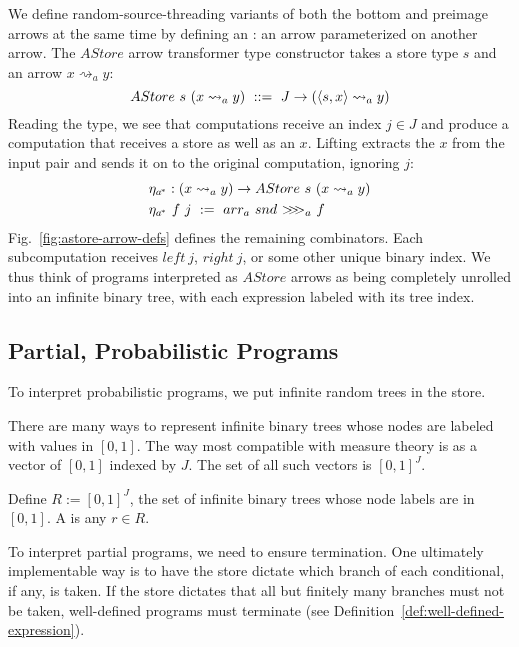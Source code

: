 \documentclass{llncs}
\newcommand{\figref}[1]{Fig.~\ref{#1}}
\newcommand{\arrow}{\rightsquigarrow}
\newcommand{\acomp}{\ensuremath{{>}\mspace{-6mu}{>}\mspace{-6mu}{>}}}
\newcommand{\gen}{_a}
\newcommand{\genc}{_{a^{\mspace{-2mu}*}}}
\begin{document}
We define random-source-threading variants of both the bottom and preimage arrows at the same time by defining an : an arrow parameterized on another arrow.
The $AStore$ arrow transformer type constructor takes a store type $s$ and an arrow $x \arrow\gen y$:
\begin{equation}
	AStore~s~(x \arrow\gen y) \ ::= \ J \to (\pair{s,x} \arrow\gen y)
\end{equation}
Reading the type, we see that computations receive an index $j \in J$ and produce a computation that receives a store as well as an $x$.
Lifting extracts the $x$ from the input pair and sends it on to the original computation, ignoring $j$:
\begin{equation}
\begin{aligned}
	&\eta\genc : (x \arrow\gen y) \to AStore~s~(x \arrow\gen y) \\
	&\eta\genc~f~j \ := \ arr\gen~snd~\acomp\gen~f
\end{aligned}
\end{equation}
\figref{fig:astore-arrow-defs} defines the remaining combinators.
Each subcomputation receives $left~j$, $right~j$, or some other unique binary index.
We thus think of programs interpreted as $AStore$ arrows as being completely unrolled into an infinite binary tree, with each expression labeled with its tree index.


\subsection{Partial, Probabilistic Programs}
\label{sec:probabilistic-programs}

To interpret probabilistic programs, we put infinite random trees in the store.

There are many ways to represent infinite binary trees whose nodes are labeled with values in $[0,1]$.
The way most compatible with measure theory is as a vector of $[0,1]$ indexed by $J$.
The set of all such vectors is $[0,1]^J$.

\begin{definition}
Define $R := [0,1]^J$, the set of infinite binary trees whose node labels are in $[0,1]$.
A  is any $r \in R$.
\end{definition}

To interpret partial programs, we need to ensure termination.
One ultimately implementable way is to have the store dictate which branch of each conditional, if any, is taken.
If the store dictates that all but finitely many branches must not be taken, well-defined programs must terminate (see Definition~\ref{def:well-defined-expression}).
\end{document}
